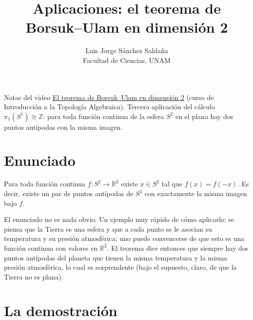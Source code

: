 \documentclass[11pt]{article}
\title{Aplicaciones: el teorema de Borsuk--Ulam en dimensión 2}
\author{Luis Jorge Sánchez Saldaña\\[2pt]\small Facultad de Ciencias, UNAM}
\date{}
\begin{document}
\maketitle

\noindent\small Notas del video
\href{https://www.youtube.com/watch?v=HlZCNLpj8qw}{\guillemotleft{}El teorema de Borsuk--Ulam en dimensión 2\guillemotright{}}
(curso de Introducción a la Topología Algebraica). Tercera aplicación del cálculo $\pi_1(S^1)\cong\mathbb{Z}$: para toda función continua de la esfera $S^2$ en el plano hay dos puntos antípodas con la misma imagen.
\normalsize

\section*{Enunciado}

\begin{teo}
Para toda función continua $f\colon S^2\to\mathbb{R}^2$ existe $x\in S^2$ tal que $f(x)=f(-x)$. Es decir, existe un par de puntos antípodas de $S^2$ con exactamente la misma imagen bajo $f$.
\end{teo}

El enunciado no es nada obvio. Un ejemplo muy rápido de cómo aplicarlo: se piensa que la Tierra es una esfera y que a cada punto se le asocian su temperatura y su presión atmosférica; uno puede convencerse de que esto es una función continua con valores en $\mathbb{R}^2$. El teorema dice entonces que siempre hay dos puntos antípodas del planeta que tienen la misma temperatura y la misma presión atmosférica, lo cual es sorprendente (bajo el supuesto, claro, de que la Tierra no es plana).

\section*{La demostración}
\end{document}
